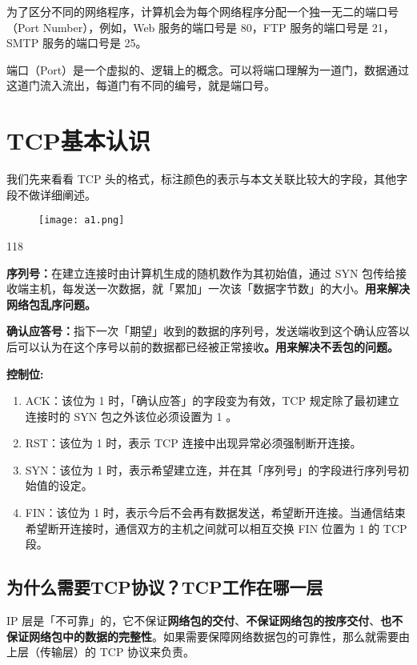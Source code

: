 \documentclass[cn,chinese,color=cyan]{elegantbook}
\begin{document}
为了区分不同的网络程序，计算机会为每个网络程序分配一个独一无二的端口号（Port Number），例如，Web 服务的端口号是 80，FTP 服务的端口号是 21，SMTP 服务的端口号是 25。

端口（Port）是一个虚拟的、逻辑上的概念。可以将端口理解为一道门，数据通过这道门流入流出，每道门有不同的编号，就是端口号。


\section{TCP基本认识}
我们先来看看 TCP 头的格式，标注颜色的表示与本文关联比较大的字段，其他字段不做详细阐述。
\begin{figure}[H]
	\centering
	\texttt{[image: a1.png]}
\end{figure}

\begin{dinglist}{118}
	

\item \textbf{序列号：}在建立连接时由计算机生成的随机数作为其初始值，通过 SYN 包传给接收端主机，每发送一次数据，就「累加」一次该「数据字节数」的大小。\textbf{用来解决网络包乱序问题。}


\item \textbf{确认应答号：}指下一次「期望」收到的数据的序列号，发送端收到这个确认应答以后可以认为在这个序号以前的数据都已经被正常接收\textbf{。用来解决不丢包的问题。}


\item  \textbf{控制位:}

\begin{enumerate}
	\item ACK：该位为 1 时，「确认应答」的字段变为有效，TCP 规定除了最初建立连接时的 SYN 包之外该位必须设置为 1 。
	
	\item RST：该位为 1 时，表示 TCP 连接中出现异常必须强制断开连接。
	
\item 	SYN：该位为 1 时，表示希望建立连，并在其「序列号」的字段进行序列号初始值的设定。
	
	\item FIN：该位为 1 时，表示今后不会再有数据发送，希望断开连接。当通信结束希望断开连接时，通信双方的主机之间就可以相互交换 FIN 位置为 1 的 TCP 段。
\end{enumerate}
\end{dinglist}

\subsection{为什么需要TCP协议？TCP工作在哪一层}
IP 层是「不可靠」的，它不保证\textbf{网络包的交付}、\textbf{不保证网络包的按序交付}、\textbf{也不保证网络包中的数据的完整性}。如果需要保障网络数据包的可靠性，那么就需要由上层（传输层）的 TCP 协议来负责。
\end{document}
